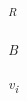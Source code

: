 \documentclass[12pt]{article}
\begin{document}

\par

\begin{adjustwidth}{1.61in}{0.0in}
\textit{\textsuperscript{R}}{\fontsize{5pt}{6.0pt}\selectfont \textit{B}\par}\par

\end{adjustwidth}


\vspace{\baselineskip}
\begin{adjustwidth}{1.26in}{0.0in}
{\fontsize{7pt}{8.4pt}\selectfont \textit{v\textsubscript{i}}\par}\par

\end{adjustwidth}


\vspace{\baselineskip}

\vspace{\baselineskip}

\vspace{\baselineskip}


\end{document}
